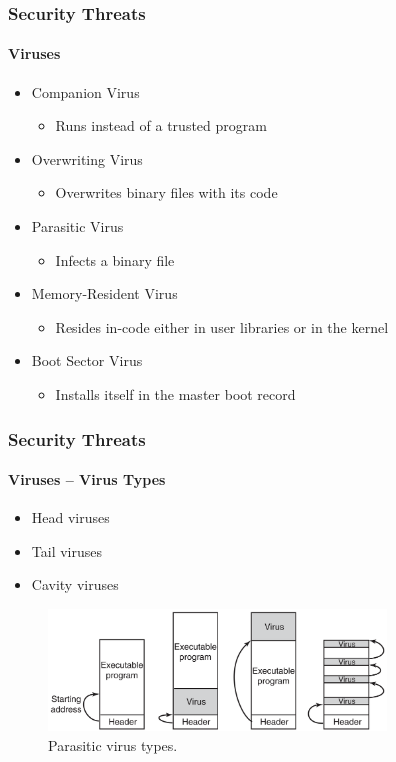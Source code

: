 \documentclass{beamer}
\begin{document}
	\begin{frame}
	\frametitle{Security Threats}
	\framesubtitle{Viruses}
	\begin{itemize}
	\setlength\itemsep{1.5em}
		\item Companion Virus
		\begin{itemize}
			\item Runs instead of a trusted program
		\end{itemize}

		\item Overwriting Virus
		\begin{itemize}
			\item Overwrites binary files with its code
		\end{itemize}

		\item Parasitic Virus
		\begin{itemize}
			\item Infects a binary file
		\end{itemize}

		\item Memory-Resident Virus
		\begin{itemize}
			\item Resides in-code either in user libraries or in the
			kernel
		\end{itemize}
	
		\item Boot Sector Virus
		\begin{itemize}
			\item Installs itself in the master boot record
		\end{itemize}
	\end{itemize}
	\end{frame}

	\begin{frame}
	\frametitle{Security Threats}
	\framesubtitle{Viruses -- Virus Types}
	\begin{itemize}
	\setlength\itemsep{1.0em}
		\item Head viruses
		\item Tail viruses
		\item Cavity viruses
	\end{itemize}
	\begin{figure}
		\centering
		\includegraphics[width=0.8\textwidth]{virus-types}
		\caption{Parasitic virus types.}
	\end{figure}
	\end{frame}
\end{document}
